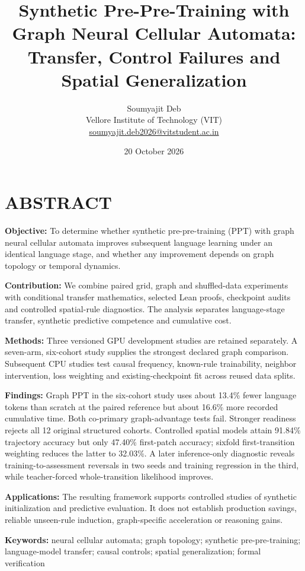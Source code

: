 \documentclass[11pt,a4paper]{article}
\title{\bfseries Synthetic Pre-Pre-Training with Graph Neural Cellular Automata: Transfer, Control Failures and Spatial Generalization}
\author{Soumyajit Deb\\Vellore Institute of Technology (VIT)\\\href{mailto:soumyajit.deb2026@vitstudent.ac.in}{soumyajit.deb2026@vitstudent.ac.in}}
\date{20 October 2026}
\begin{document}
\maketitle
\section*{ABSTRACT}
\textbf{Objective:} To determine whether synthetic pre-pre-training (PPT) with graph neural cellular automata improves subsequent language learning under an identical language stage, and whether any improvement depends on graph topology or temporal dynamics.\par
\textbf{Contribution:} We combine paired grid, graph and shuffled-data experiments with conditional transfer mathematics, selected Lean proofs, checkpoint audits and controlled spatial-rule diagnostics. The analysis separates language-stage transfer, synthetic predictive competence and cumulative cost.\par
\textbf{Methods:} Three versioned GPU development studies are retained separately. A seven-arm, six-cohort study supplies the strongest declared graph comparison. Subsequent CPU studies test causal frequency, known-rule trainability, neighbor intervention, loss weighting and existing-checkpoint fit across reused data splits.\par
\textbf{Findings:} Graph PPT in the six-cohort study uses about 13.4\% fewer language tokens than scratch at the paired reference but about 16.6\% more recorded cumulative time. Both co-primary graph-advantage tests fail. Stronger readiness rejects all 12 original structured cohorts. Controlled spatial models attain 91.84\% trajectory accuracy but only 47.40\% first-patch accuracy; sixfold first-transition weighting reduces the latter to 32.03\%. A later inference-only diagnostic reveals training-to-assessment reversals in two seeds and training regression in the third, while teacher-forced whole-transition likelihood improves.\par
\textbf{Applications:} The resulting framework supports controlled studies of synthetic initialization and predictive evaluation. It does not establish production savings, reliable unseen-rule induction, graph-specific acceleration or reasoning gains.\par
\textbf{Keywords:} neural cellular automata; graph topology; synthetic pre-pre-training; language-model transfer; causal controls; spatial generalization; formal verification\par\clearpage
\end{document}
